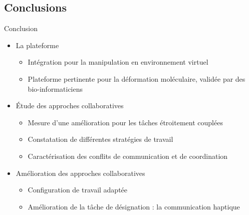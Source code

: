 \documentclass[english,french,dvips,10pt]{mybeamer}
\begin{document}
	\subsection{Conclusions}
	\begin{myframe}{Conclusion}
		\begin{itemize}
				\vfill
			\item La plateforme \myShaddock
				\begin{itemize}
					\item Intégration pour la manipulation en environnement virtuel
					\item Plateforme pertinente pour la déformation moléculaire, validée par des bio-informaticiens
				\end{itemize}
				\vfill
			\item Étude des approches collaboratives
				\begin{itemize}
					\item Mesure d'une amélioration pour les tâches étroitement couplées
					\item Constatation de différentes stratégies de travail
					\item Caractérisation des conflits de communication et de coordination
				\end{itemize}
				\vfill
			\item Amélioration des approches collaboratives
				\begin{itemize}
					\item Configuration de travail adaptée
					\item Amélioration de la tâche de désignation : la communication haptique
				\end{itemize}
				\vfill
		\end{itemize}
	\end{myframe}
\end{document}
